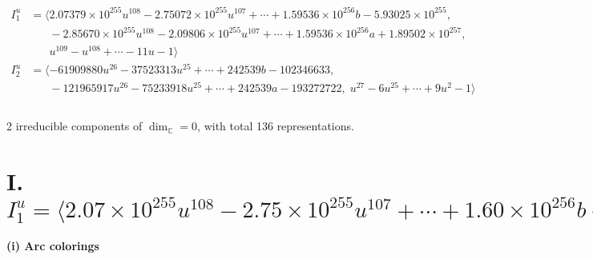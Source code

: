 \documentclass[1p]{elsarticle_modified}
\theoremstyle{definition}
\begin{document}
\begin{align*}
I^u_{1}&=\langle 
2.07379\times10^{255} u^{108}-2.75072\times10^{255} u^{107}+\cdots+1.59536\times10^{256} b-5.93025\times10^{255},\\
\phantom{I^u_{1}}&\phantom{= \langle  }-2.85670\times10^{255} u^{108}-2.09806\times10^{255} u^{107}+\cdots+1.59536\times10^{256} a+1.89502\times10^{257},\\
\phantom{I^u_{1}}&\phantom{= \langle  }u^{109}- u^{108}+\cdots-11 u-1\rangle \\
I^u_{2}&=\langle 
-61909880 u^{26}-37523313 u^{25}+\cdots+242539 b-102346633,\\
\phantom{I^u_{2}}&\phantom{= \langle  }-121965917 u^{26}-75233918 u^{25}+\cdots+242539 a-193272722,\;u^{27}-6 u^{25}+\cdots+9 u^2-1\rangle \\
\\
\end{align*}
\raggedright * 2 irreducible components of $\dim_{\mathbb{C}}=0$, with total 136 representations.\\
\newpage
\renewcommand{\arraystretch}{1}
\centering \section*{I. $I^u_{1}= \langle 2.07\times10^{255} u^{108}-2.75\times10^{255} u^{107}+\cdots+1.60\times10^{256} b-5.93\times10^{255},\;-2.86\times10^{255} u^{108}-2.10\times10^{255} u^{107}+\cdots+1.60\times10^{256} a+1.90\times10^{257},\;u^{109}- u^{108}+\cdots-11 u-1 \rangle$}
\flushleft \textbf{(i) Arc colorings}\\
\end{document}
